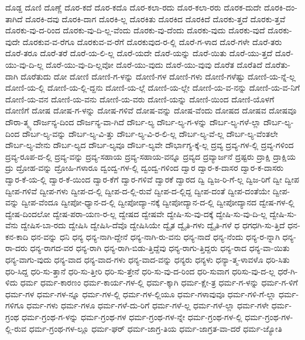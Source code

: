 {ದೊಡ್ದ
ದೊಣಿ
ದೊಣ್ಣೆ
ದೊರ-ಕದೆ
ದೊರ-ಕದೊ
ದೊರ-ಕಲಾ-ರದು
ದೊರ-ಕಲಾ-ರರು
ದೊರಕ-ದುದೇ
ದೊರಕಿ-ದಂ-ತಾಗಿದೆ
ದೊರಕಿ-ದವು
ದೊರಕಿ-ದಾಗ
ದೊರಕಿ-ಲ್ಲ
ದೊರಕಿತು
ದೊರಕಿದ
ದೊರಕಿದೆ
ದೊರಕು-ತ್ತದೆ
ದೊರಕು-ತ್ತವೆ
ದೊರಕು-ವು-ದ-ರಿಂದ
ದೊರಕು-ವು-ದಿ-ಲ್ಲ-ವೆಂದು
ದೊರಕು-ವು-ದೆಂದು
ದೊರಕು-ವುದು
ದೊರಕು-ವುದೆ
ದೊರಕು-ವುದೇ
ದೊರಕುವ-ವ-ರೆಗೂ
ದೊರಕುವ-ವ-ರೆಗೆ
ದೊರಕುವುದ-ರ-ಲ್ಲಿ
ದೊರೆ-ಗ-ಳಾದ
ದೊರೆ-ಗಳೇ
ದೊರೆ-ತರು
ದೊರೆ-ತರೂ
ದೊರೆ-ತರೆ
ದೊರೆ-ಯ-ಲಿ-ಲ್ಲ
ದೊರೆ-ಯದೇ
ದೊರೆ-ಯನ್ನು
ದೊರೆ-ಯಿತು
ದೊರೆ-ಯು-ತ್ತದೆ
ದೊರೆ-ಯು-ವು-ದಿ-ಲ್ಲ
ದೊರೆ-ಯು-ವು-ದಿ-ಲ್ಲವೋ
ದೊರೆ-ಯು-ವುದು
ದೊರೆ-ಯು-ವುವು
ದೊರೆತ
ದೊರೆತಿದೆ
ದೊರೆತು-ದಾಗಿ
ದೊರೆತುದು
ದೋ
ದೋಣಿ
ದೋಣಿ-ಗ-ಳನ್ನು
ದೋಣಿ-ಗಳ
ದೋಣಿ-ಗಳು
ದೋಣಿ-ಗಳೆಷ್ಟು
ದೋಣಿ-ಯ-ನ್ನೆ-ಲ್ಲ
ದೋಣಿ-ಯ-ಲ್ಲಿ
ದೋಣಿ-ಯ-ಲ್ಲಿ-ದ್ದನು
ದೋಣಿ-ಯ-ಲ್ಲೆ
ದೋಣಿ-ಯ-ಲ್ಲೇ
ದೋಣಿ-ಯ-ವ-ನನ್ನು
ದೋಣಿ-ಯ-ವ-ನಿಗೆ
ದೋಣಿ-ಯ-ವನ
ದೋಣಿ-ಯ-ವನು
ದೋಣಿ-ಯ-ವರು
ದೋಣಿ-ಯನ್ನು
ದೋಣಿ-ಯಿಂದ
ದೋಣಿ-ಯೊಳಗೆ
ದೋಣಿಗೆ
ದೋಷ
ದೋಷ-ಗ-ಳನ್ನು
ದೋಷ-ಗಳಿವೆ
ದೋಷ-ವನ್ನು
ದೋಷ-ವೆಂದು
ದೋಷದ
ದೋಷವ
ದೋಷವೂ
ದೌರಾ-ತ್ಮ್ಯ
ದೌರ್ಜನ್ಯ-ದಿಂದ
ದೌರ್ಜನ್ಯ-ವಾ-ಗಿದೆ
ದೌರ್ಬ-ಲ್ಯ
ದೌರ್ಬ-ಲ್ಯ-ಗ-ಳನ್ನು
ದೌರ್ಬ-ಲ್ಯ-ಗಳೆ-ಲ್ಲಾ
ದೌರ್ಬ-ಲ್ಯ-ದಿಂದ
ದೌರ್ಬ-ಲ್ಯ-ವನ್ನು
ದೌರ್ಬ-ಲ್ಯ-ವಿ-ತ್ತು
ದೌರ್ಬ-ಲ್ಯ-ವಿ-ರ-ಲಿ-ಲ್ಲ
ದೌರ್ಬ-ಲ್ಯ-ವೆ-ಲ್ಲ
ದೌರ್ಬ-ಲ್ಯ-ವೆಂತಲೇ
ದೌರ್ಬ-ಲ್ಯ-ವೇನು
ದೌರ್ಬ-ಲ್ಯದ
ದೌರ್ಬ-ಲ್ಯವೂ
ದೌರ್ಬ-ಲ್ಯವೇ
ದೌರ್ಭಾಗ್ಯ-ಕ್ಕೆ-ಲ್ಲ
ದ್ರವ್ಯ
ದ್ರವ್ಯ-ಗಳ-ಲ್ಲಿ
ದ್ರವ್ಯ-ಗಳಿಂದ
ದ್ರವ್ಯ-ರೂಪ-ದ-ಲ್ಲಿ
ದ್ರವ್ಯ-ವನ್ನು
ದ್ರವ್ಯ-ಸಹಾಯ
ದ್ರವ್ಯ-ಸಹಾಯ-ವನ್ನೂ
ದ್ರವ್ಯದ
ದ್ರವ್ಯಾರ್ಜನೆ
ದ್ರಷ್ಟರು
ದ್ರಾಕ್ಷಿ
ದ್ರಾಕ್ಷಿಯ
ದ್ರು
ದ್ರೋಹ-ವನ್ನು
ದ್ರೋಹಿ-ಗಳಾರೂ
ದ್ವಂದ್ವ-ಗಳ-ಲ್ಲಿ
ದ್ವಂದ್ವ-ಗಳಿಂದ
ದ್ವಾರ
ದ್ವಾರ-ಕ-ದಾಸರ
ದ್ವಾರ-ಕ-ದಾಸರು
ದ್ವಾರ-ಕೆ-ಯ-ಲ್ಲಿ
ದ್ವಾರ-ಕೆ-ಯಿಂದ
ದ್ವಾರ-ಕೆಗೆ
ದ್ವಾರ-ಗಳಿವೆ
ದ್ವಾರಕೆ
ದ್ವಾರದ
ದ್ವಿ
ದ್ವಿಜ-ರಿ-ಗೆ-ಲ್ಲ
ದ್ವಿಜ-ರಿಗೆ
ದ್ವೀ
ದ್ವೀಪ
ದ್ವೀಪ-ಗಳಿವೆ
ದ್ವೀಪ-ಗಳು
ದ್ವೀಪ-ದ-ಲ್ಲಿ
ದ್ವೀಪ-ದ-ಲ್ಲಿ-ರುವೆ
ದ್ವೀಪ-ದ-ಲ್ಲಿದ್ದ
ದ್ವೀಪ-ದಂತೆ
ದ್ವೀಪ-ದಂತೆಯೇ
ದ್ವೀಪ-ವನ್ನು
ದ್ವೀಪ-ವೆಂದೂ
ದ್ವೀಪೋ-ಧ್ಯಾನ-ದ-ಲ್ಲಿ
ದ್ವೀಪೋದ್ಯಾ-ನಕ್ಕೆ
ದ್ವೀಪೋದ್ಯಾನ-ದ-ಲ್ಲಿ
ದ್ವೀಪೋದ್ಯಾನದ
ದ್ವೇಷ-ಗಳ-ಲ್ಲಿ
ದ್ವೇಷ-ದಿಂದಲೋ
ದ್ವೇಷ-ಪರಾ-ಯಣ-ರ-ಲ್ಲ
ದ್ವೇಷದ
ದ್ವೇಷವೇ
ದ್ವೇಷಿ-ಸು-ವು-ದಕ್ಕೆ
ದ್ವೇಷಿ-ಸು-ವು-ದಿ-ಲ್ಲ
ದ್ವೇಷಿ-ಸು-ವೆನು
ದ್ವೇಷಿಸ-ಬಾ-ರದು
ದ್ವೇಷಿಸಿ
ದ್ವೇಷಿಸಿ-ದೆವೊ
ದ್ವೇಷಿಸಿಯೇ
ದ್ವೈತ
ದ್ವೈತಿ-ಗಳು
ದ್ವೈತಿ-ಗಳೆ
ಧ
ಧಗಧಗಿ-ಸು-ತ್ತಿದೆ
ಧನ-ಕನ-ಕಾದಿ
ಧನ-ವನ್ನು
ಧನಿ
ಧನ್ಯ
ಧನ್ಯ-ನಾಗಿ-ದ್ದೇನೆ
ಧನ್ಯ-ನಾಗಿ-ರು-ವನು
ಧನ್ಯ-ನಾದೆ
ಧನ್ಯ-ನೆಂದು
ಧನ್ಯ-ರ-ನ್ನಾಗಿ
ಧನ್ಯ-ರಾ-ದರು
ಧನ್ಯ-ರಾಗದ-ವರ
ಧನ್ಯ-ರಾಗಿ
ಧನ್ಯ-ರಾಗಿ-ಬಿಡು-ತ್ತಿದ್ದೆವು
ಧನ್ಯ-ರಾಗು-ತ್ತಿದ್ದರು
ಧನ್ಯ-ರಾದ
ಧನ್ಯ-ವಾ-ಯಿತು
ಧನ್ಯ-ವಾಗು-ವುದು
ಧನ್ಯ-ವಾದ
ಧನ್ಯ-ವಾದ-ಗಳು
ಧನ್ಯ-ವಾದ-ವನ್ನು
ಧನ್ಯರು
ಧನ್ಯಳು
ಧನ್ಯಾ-ತ್ಮ-ಳಾವಳೊ
ಧರಿ-ಸಿತು
ಧರಿ-ಸಿದ್ದ
ಧರಿ-ಸು-ತ್ತಾನೆ
ಧರಿ-ಸು-ತ್ತೀರಿ
ಧರಿ-ಸು-ತ್ತೇನೆ
ಧರಿ-ಸು-ವು-ದ-ರಿಂದ
ಧರಿ-ಸುವಾಗ
ಧರಿಸು-ವು-ದ-ಲ್ಲ
ಧರೆ-ಗಿ-ಳಿದು
ಧರ್ಮ
ಧರ್ಮ-ಕಾರಣಂ
ಧರ್ಮ-ಕಾರ್ಯ-ಗಳ-ಲ್ಲಿ
ಧರ್ಮ-ಕ್ಕಾಗಿ
ಧರ್ಮ-ಕ್ಷೇ-ತ್ರ
ಧರ್ಮ-ಗ-ಳನ್ನು
ಧರ್ಮ-ಗ-ಳಿಗೆ
ಧರ್ಮ-ಗಳ
ಧರ್ಮ-ಗಳ-ನ್ನೂ
ಧರ್ಮ-ಗಳ-ಲ್ಲಿ
ಧರ್ಮ-ಗಳ-ಲ್ಲಿಯೂ
ಧರ್ಮ-ಗಳಾವುವೂ
ಧರ್ಮ-ಗಳಿ-ಗೆ-ಲ್ಲಾ
ಧರ್ಮ-ಗಳಿಗೂ
ಧರ್ಮ-ಗಳು
ಧರ್ಮ-ಗಳೂ
ಧರ್ಮ-ಗಳೆ-ದು-ರಿಗೆ
ಧರ್ಮ-ಗಳೆ-ಲ್ಲ
ಧರ್ಮ-ಗಳೆ-ಲ್ಲಾ
ಧರ್ಮ-ಗಳೇ
ಧರ್ಮ-ಗ್ರಂಥ
ಧರ್ಮ-ಗ್ರಂಥ-ಗ-ಳನ್ನು
ಧರ್ಮ-ಗ್ರಂಥ-ಗಳ
ಧರ್ಮ-ಗ್ರಂಥ-ಗಳ-ನ್ನೇ
ಧರ್ಮ-ಗ್ರಂಥ-ಗಳ-ಲ್ಲಿ
ಧರ್ಮ-ಗ್ರಂಥ-ಗಳ-ಲ್ಲಿ-ರುವ
ಧರ್ಮ-ಗ್ರಂಥ-ಗಳ-ಲ್ಲೂ
ಧರ್ಮ-ಘರ್
ಧರ್ಮ-ಜಾಗ್ರ-ತಿಯ
ಧರ್ಮ-ಜಾಗ್ರತ-ವಾ-ದರೆ
ಧರ್ಮ-ಜ್ಯೋತಿ
}
